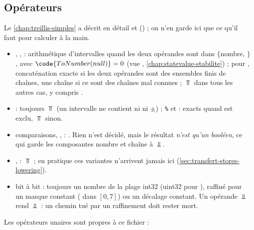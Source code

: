 \subsection{Opérateurs}

Le \cref{chap:treillis-simples} a décrit en détail  et
 () ;
on n'en garde ici que ce qu'il faut pour calculer à la main.
\begin{itemize}
  \item \code{+}, \code{-}, \code{*} : arithmétique d'intervalles quand les
    deux opérandes sont dans $\{$nombre, $\}$, avec
    $\code{ToNumber(null)} = 0$ (vue ,
    \cref{chap:statevalue-stabilite}) ; pour \code{+}, concaténation exacte
    si les deux opérandes sont des ensembles finis de chaînes, \og une
    chaîne\fg{} si ce sont des chaînes mal connues ; $\Top$ dans tous les
    autres cas, y compris .
  \item \code{/} : toujours $\Top$ (un intervalle ne contient ni 
    ni $\pm$) ; \texttt{\%} et \code{**} : exacts quand
     est exclu, $\Top$ sinon.
  \item comparaisons, ,  : .
    Rien n'est décidé, mais le résultat \emph{n'est qu'un booléen}, ce qui
    garde les composantes nombre et chaîne à $\Bot$.
  \item \code{&&}, \code{||} : $\Top$ ; en pratique ces variantes
    n'arrivent jamais ici (\cref{sec:transfert-stores-lowering}).
  \item bit à bit : toujours un nombre de la plage int32 (uint32 pour
    \code{>>>}), raffiné pour un masque constant ( dans
    $[0,7]$) ou un décalage constant. Un opérande $\Bot$ rend $\Bot$ : un
    chemin tué par un raffinement doit rester mort.
\end{itemize}

Les opérateurs unaires sont propres à ce fichier :


